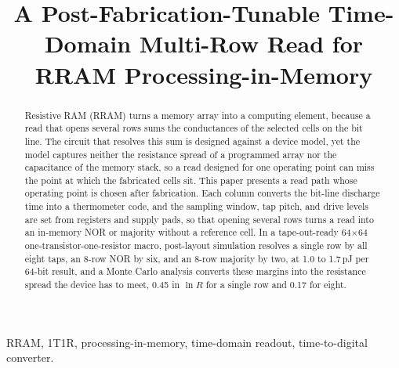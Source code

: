 \documentclass[conference]{IEEEtran}
\begin{document}
\title{A Post-Fabrication-Tunable Time-Domain Multi-Row Read for RRAM Processing-in-Memory}

\author{
}

\maketitle

\begin{abstract}
Resistive RAM (RRAM) turns a memory array into a computing element, because a read that opens several rows sums the conductances of the selected cells on the bit line.
The circuit that resolves this sum is designed against a device model, yet the model captures neither the resistance spread of a programmed array nor the capacitance of the memory stack, so a read designed for one operating point can miss the point at which the fabricated cells sit.
This paper presents a read path whose operating point is chosen after fabrication.
Each column converts the bit-line discharge time into a thermometer code, and the sampling window, tap pitch, and drive levels are set from registers and supply pads, so that opening several rows turns a read into an in-memory NOR or majority without a reference cell.
In a tape-out-ready 64$\times$64 one-transistor-one-resistor macro, post-layout simulation resolves a single row by all eight taps, an 8-row NOR by six, and an 8-row majority by two, at 1.0 to 1.7\,pJ per 64-bit result, and a Monte Carlo analysis converts these margins into the resistance spread the device has to meet, 0.45 in $\ln R$ for a single row and 0.17 for eight.
\end{abstract}

\begin{IEEEkeywords}
RRAM, 1T1R, processing-in-memory, time-domain readout, time-to-digital converter.
\end{IEEEkeywords}









\end{document}
